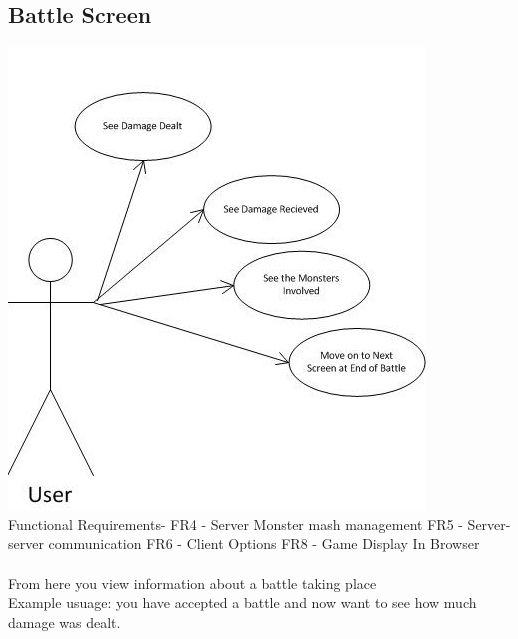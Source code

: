 \documentclass{project}
\begin{document}
\subsection{Battle Screen}
\includegraphics[scale=0.6]{BattleScreenUseCase.jpg}
\\
Functional Requirements-
FR4 - Server Monster mash management
FR5 - Server-server communication
FR6 - Client Options
FR8 - Game Display In Browser
\\
\\
From here you view information about a battle taking place
\\
Example usuage: you have accepted a battle and now want to see how much damage was dealt.


\newpage
\end{document}
